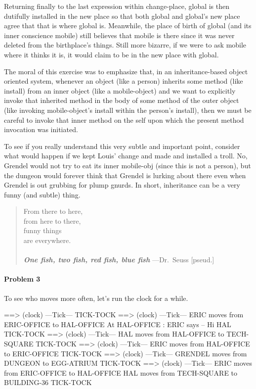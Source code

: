 Returning finally to the last expression within {\cf change-place}, {\cf
global} is then dutifully installed in the new place so that both {\cf global}
and {\cf global}'s new place agree that that is where {\cf global} is.
Meanwhile, the place of birth of {\cf global} (and its inner conscience {\cf
mobile}) still believes that {\cf mobile} is there since it was never deleted
from the birthplace's {\cf things}. Still more bizarre, if we were to ask {\cf
mobile} where it thinks it is, it would claim to be in the new place with {\cf
global}.

The moral of this exercise was to emphasize that, in an inheritance-based
object oriented system, whenever an object (like a {\cf person}) inherits some
method (like {\cf install}) from an inner object (like a {\cf mobile-object})
and we want to explicitly invoke that inherited method in the body of some
method of the outer object (like invoking {\cf mobile-object}'s {\cf install}
within the {\cf person}'s {\cf install}), then we must be careful to invoke
that inner method on the {\cf self} upon which the present method invocation
was initiated.

To see if you really understand this very subtle and important
point, consider what would happen if we kept Louis' change and made and
installed a {\cf troll}.  No, Grendel would not try to eat its inner {\cf
mobile-obj} (since this is not a {\cf person}), but the {\cf dungeon} would
forever think that Grendel is lurking about there even when Grendel is out
grubbing for plump gnurds.  In short, inheritance can be a very funny (and
subtle) thing.

\begin{verse}
  From there to here, \\
  from here to there, \\
  funny things \\
  are everywhere. \\
  \mbox{} \\
  {\bf\sl One fish, two fish, red fish, blue fish} ---Dr.~Seuss [pseud.]
\end{verse}

\newpage

\paragraph{Problem 3}

To see who moves more often, let's run the clock for a while.

\beginlisp
==> (clock)
---Tick---
TICK-TOCK
\null
==> (clock)
---Tick---
ERIC moves from ERIC-OFFICE to HAL-OFFICE
At HAL-OFFICE : ERIC says -- Hi HAL
TICK-TOCK
\null
==> (clock)
---Tick---
HAL moves from HAL-OFFICE to TECH-SQUARE
TICK-TOCK
\null
==> (clock)
---Tick---
ERIC moves from HAL-OFFICE to ERIC-OFFICE
TICK-TOCK
\null
==> (clock)
---Tick---
GRENDEL moves from DUNGEON to EGG-ATRIUM
TICK-TOCK
\null
==> (clock)
---Tick---
ERIC moves from ERIC-OFFICE to HAL-OFFICE
HAL moves from TECH-SQUARE to BUILDING-36
TICK-TOCK
\endlisp

